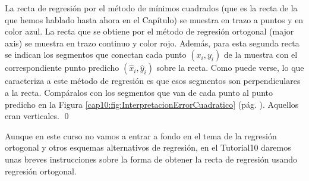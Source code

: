 \begin{ejemplo}
La recta de regresión por el método de mínimos cuadrados (que es la recta de la que hemos hablado hasta ahora en el Capítulo) se muestra en trazo a puntos y en color azul. La recta que se obtiene por el método de regresión ortogonal (major axis) se muestra en trazo continuo y color rojo.  Además, para esta segunda recta se indican los segmentos  que conectan cada punto $(x_i,y_i)$ de la muestra con el correspondiente punto predicho $(\hat x_i, \hat y_i)$ sobre la recta. Como puede verse, lo que caracteriza a este método de regresión es que esos segmentos son perpendiculares a la recta. Compáralos con los segmentos que van de cada punto al punto predicho en la Figura \ref{cap10:fig:InterpretacionErrorCuadratico} (pág. \pageref{cap10:fig:InterpretacionErrorCuadratico}). Aquellos eran verticales.
\qed
\end{ejemplo}
Aunque en este curso no vamos a entrar a fondo en el tema de la regresión ortogonal y otros esquemas alternativos de regresión, en el Tutorial10 daremos unas breves instrucciones sobre la forma de obtener la recta de regresión usando regresión ortogonal.


